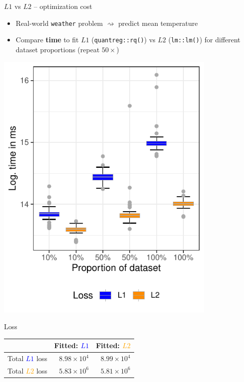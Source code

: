 \documentclass[11pt,compress,t,notes=noshow, xcolor=table]{beamer}
\begin{document}

\begin{vbframe}{$L1$ vs $L2$ -- optimization cost}

\begin{itemize}
    \item Real-world \texttt{weather} problem $\rightsquigarrow$ 
    predict mean temperature
    \item Compare \textbf{time} to fit $L1$ (\texttt{quantreg::rq()}) vs 
    $L2$ (\texttt{lm::lm()})
    for different dataset proportions (repeat $50\times$)
\end{itemize}

\vfill

\begin{minipage}[c]{0.54\textwidth}
    \centering
    \includegraphics[width=0.8\textwidth]{figure/reg_l1_benchmark.pdf}
\end{minipage}
\scriptsize
\begin{minipage}[c]{0.45\textwidth}

    Loss
    
    \begin{tabular}{l|r|r}
        & Fitted: \textcolor{blue}{$L1$}  &
        Fitted: \textcolor{orange}{$L2$} \\ \hline
        Total \textcolor{blue}{$L1$} loss & $8.98 \times 10^4$ & 
        $8.99 \times 10^4$ \\
        Total \textcolor{orange}{$L2$} loss & $5.83 \times 10^6$ & 
        $5.81 \times 10^6$ \\
    \end{tabular}
    

\end{minipage}
\end{vbframe}
\end{document}
